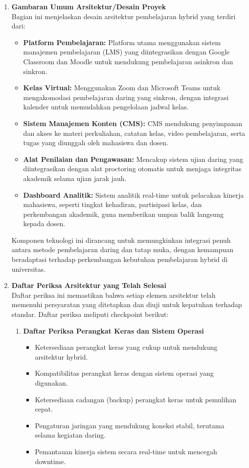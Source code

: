 \begin{enumerate}
	\item \textbf{Gambaran Umum Arsitektur/Desain Proyek} \\
	Bagian ini menjelaskan desain arsitektur pembelajaran hybrid yang terdiri dari:
	\begin{itemize}
		\item \textbf{Platform Pembelajaran:} Platform utama menggunakan sistem manajemen pembelajaran (LMS) yang diintegrasikan dengan Google Classroom dan Moodle untuk mendukung pembelajaran asinkron dan sinkron.
		\item \textbf{Kelas Virtual:} Menggunakan Zoom dan Microsoft Teams untuk mengakomodasi pembelajaran daring yang sinkron, dengan integrasi kalender untuk memudahkan pengelolaan jadwal kelas.
		\item \textbf{Sistem Manajemen Konten (CMS):} CMS mendukung penyimpanan dan akses ke materi perkuliahan, catatan kelas, video pembelajaran, serta tugas yang diunggah oleh mahasiswa dan dosen.
		\item \textbf{Alat Penilaian dan Pengawasan:} Mencakup sistem ujian daring yang diintegrasikan dengan alat proctoring otomatis untuk menjaga integritas akademik selama ujian jarak jauh.
		\item \textbf{Dashboard Analitik:} Sistem analitik real-time untuk pelacakan kinerja mahasiswa, seperti tingkat kehadiran, partisipasi kelas, dan perkembangan akademik, guna memberikan umpan balik langsung kepada dosen.
	\end{itemize}
	Komponen teknologi ini dirancang untuk memungkinkan integrasi penuh antara metode pembelajaran daring dan tatap muka, dengan kemampuan beradaptasi terhadap perkembangan kebutuhan pembelajaran hybrid di universitas.
	
	
	\item \textbf{Daftar Periksa Arsitektur yang Telah Selesai} \\
	Daftar periksa ini memastikan bahwa setiap elemen arsitektur telah memenuhi persyaratan yang ditetapkan dan diuji untuk kepatuhan terhadap standar. Daftar periksa meliputi checkpoint berikut:
	
	\begin{enumerate}
		\item \textbf{Daftar Periksa Perangkat Keras dan Sistem Operasi} 
		\begin{itemize}
			\item Ketersediaan perangkat keras yang cukup untuk mendukung arsitektur hybrid.
			\item Kompatibilitas perangkat keras dengan sistem operasi yang digunakan.
			\item Ketersediaan cadangan (backup) perangkat keras untuk pemulihan cepat.
			\item Pengaturan jaringan yang mendukung koneksi stabil, terutama selama kegiatan daring.
			\item Pemantauan kinerja sistem secara real-time untuk mencegah downtime.
		\end{itemize}
		

\end{enumerate}
\end{enumerate}

